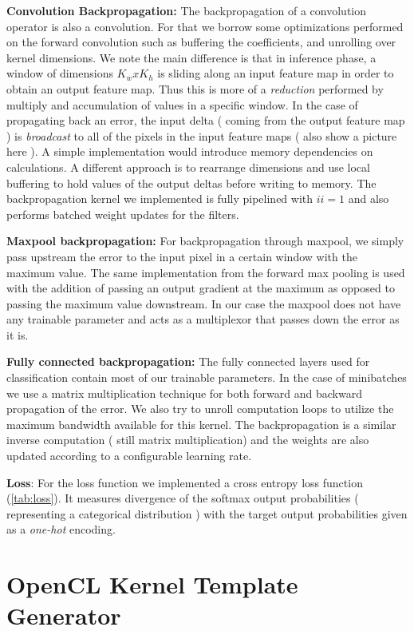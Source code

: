 \textbf{Convolution Backpropagation:} The backpropagation of a convolution operator is also a convolution. For that we borrow some optimizations performed on the forward convolution such as buffering the coefficients, and unrolling over kernel dimensions. We note the main difference is that in inference phase, a window of dimensions $ K_wxK_h $ is sliding along an input feature map in order to obtain an output feature map. Thus this is more of a \emph{reduction} performed by multiply and accumulation of values in a specific window. In the case of propagating back an error, the input delta ( coming from the output feature map ) is \emph{broadcast} to all of the pixels in the input feature maps ( also show a picture here ). A simple implementation would introduce memory dependencies on calculations. A different approach is to rearrange dimensions and use local buffering to hold values of the output deltas before writing to memory. The backpropagation kernel we implemented is fully pipelined with $ ii=1 $ and also performs batched weight updates for the filters.

\textbf{Maxpool backpropagation:} For backpropagation through maxpool, we simply pass upstream the error to the input pixel in a certain window with the maximum value. The same implementation from the forward max pooling is used with the addition of passing an output gradient at the maximum as opposed to passing the maximum value downstream. In our case the maxpool does not have any trainable parameter and acts as a multiplexor that passes down the error as it is. 

\textbf{Fully connected backpropagation:} The fully connected layers used for classification contain most of our trainable parameters. In the case of minibatches we use a matrix multiplication technique for both forward and backward propagation of the error. We also try to unroll computation loops to utilize the maximum bandwidth available for this kernel. The backpropagation is a similar inverse computation ( still matrix multiplication)  and the weights are also updated according to a configurable learning rate.

\textbf{Loss}: For the loss function we implemented a cross entropy loss function (\ref{tab:loss}). It measures divergence of the softmax output probabilities ( representing a categorical distribution ) with the target output probabilities given as a \emph{one-hot} encoding.

\section{OpenCL Kernel Template Generator}

